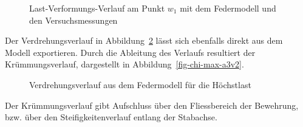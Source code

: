 \documentclass[
  11pt,
  letterpaper,
]{scrreprt}
\begin{document}
\begin{figure}[H]


\caption{\label{fig-fwa3v2}Last-Verformungs-Verlauf am Punkt \(w_1\) mit
dem Federmodell und den Versuchsmessungen}

\end{figure}%

Der Verdrehungsverlauf in Abbildung~\ref{fig-phi-max-a3v2} lässt sich
ebenfalls direkt aus dem Modell exportieren. Durch die Ableitung des
Verlaufs resultiert der Krümmungsverlauf, dargestellt in
Abbildung~\ref{fig-chi-max-a3v2}.

\begin{figure}[H]


\caption{\label{fig-phi-max-a3v2}Verdrehungsverlauf aus dem Federmodell
für die Höchstlast}

\end{figure}%

Der Krümmungsverlauf gibt Aufschluss über den Fliessbereich der
Bewehrung, bzw. über den Steifigkeitenverlauf entlang der Stabachse.
\end{document}
